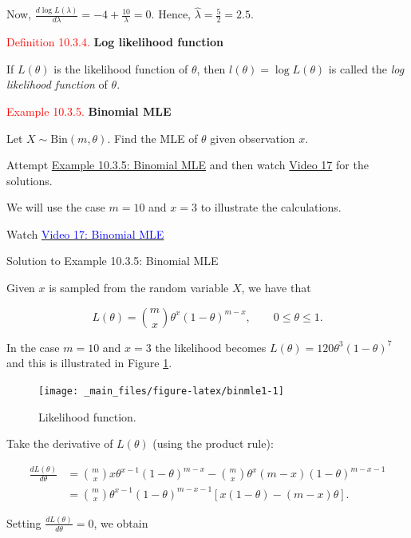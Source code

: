 \documentclass[
]{book}
\begin{document}
Now, \(\frac{d \log L(\lambda)}{d\lambda} = -4 + \frac{10}{\lambda} = 0\). Hence, \(\hat{\lambda} = \frac{5}{2} = 2.5\).

\leavevmode{}%
\textcolor{red}{Definition 10.3.4.}
{\textbf{Log likelihood function}}

If \(L(\theta)\) is the likelihood function of \(\theta\), then \(l(\theta)=\log L(\theta)\) is called the \emph{log likelihood function} of \(\theta\).

\leavevmode{}%
\textcolor{red}{Example 10.3.5.}
{\textbf{Binomial MLE}}

Let \(X \sim \text{Bin}(m,\theta)\). Find the MLE of \(\theta\) given observation \(x\).

Attempt \protect\hyperlink{MLE:exer:bin_mle}{Example 10.3.5: Binomial MLE} and then watch \protect\hyperlink{video17}{Video 17} for the solutions.

We will use the case \(m=10\) and \(x=3\) to illustrate the calculations.

Watch \href{https://mediaspace.nottingham.ac.uk/media/Binomial+MLE+FINAL+VERSION/1_5slobzch}{\textcolor{blue}{Video 17: Binomial MLE}}

Solution to Example 10.3.5: Binomial MLE

Given \(x\) is sampled from the random variable \(X\), we have that

\[L(\theta) = {m \choose x} \theta^x (1-\theta)^{m-x}, \qquad 0 \leq \theta \leq 1.\]

In the case \(m=10\) and \(x=3\) the likelihood becomes \(L(\theta) = 120 \theta^3 (1-\theta)^7\) and this is illustrated in Figure \ref{fig:binmle1}.

\begin{figure}
\texttt{[image: \_main\_files/figure-latex/binmle1-1]} \caption{Likelihood function.}\label{fig:binmle1}
\end{figure}

Take the derivative of \(L(\theta)\) (using the product rule):

\begin{align*}
\frac{d L(\theta)}{d\theta} &= {m \choose x} x \theta^{x-1} (1-\theta)^{m-x} - {m \choose x} \theta^{x} (m-x) (1-\theta)^{m-x-1} \\[3pt]
&= {m \choose x} \theta^{x-1} (1-\theta)^{m-x-1} \left[ x(1-\theta) - (m-x)\theta \right].
\end{align*}

Setting \(\frac{d L(\theta)}{d\theta} = 0\), we obtain
\end{document}
